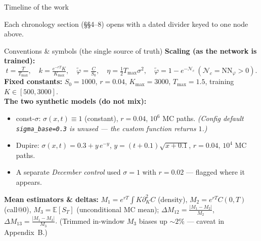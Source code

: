 \documentclass[aspectratio=169,11pt]{beamer}
\newcommand{\gold}[1]{{\color{ntugold}#1}}
\begin{document}
\begin{frame}{Timeline of the work}
  \vspace{0.2cm}
  \begin{center}
  \end{center}
  \vspace{0.4em}
  {\footnotesize Each chronology section (\S\S4--8) opens with a dated divider keyed to one node above.}
\end{frame}

\begin{frame}{Conventions \& symbols (the single source of truth)}
  \small
  \textbf{Scaling (as the network is trained):}
  \[
    t=\tfrac{T}{T_{\max}},\quad k=\tfrac{e^{-rT}K}{K_{\max}},\quad
    \tilde\varphi=\tfrac{C}{S_0},\quad \eta=\tfrac{1}{2}T_{\max}\sigma^2,\quad
    \boxed{\tilde\varphi=1-e^{-\mathcal{N}_c}}\ (\mathcal{N}_c=\mathrm{NN}_\varphi>0).
  \]
  \textbf{Fixed constants:} $S_0=1000$, $r=0.04$, $K_{\max}=3000$, $T_{\max}=1.5$, training $K\in[500,3000]$.\\[0.3em]
  \textbf{The two synthetic models (do not mix):}
  \begin{itemize}\footnotesize
    \item \gold{const-$\sigma$}: $\sigma(x,t)\equiv1$ (constant), $r=0.04$, $10^6$ MC paths.
          \emph{(Config default \texttt{sigma\_base=0.3} is unused --- the custom function returns $1$.)}
    \item \gold{Dupire}: $\sigma(x,t)=0.3+y\,e^{-y}$, $y=(t{+}0.1)\sqrt{x{+}0.1}$, $r=0.04$, $10^4$ MC paths.
    \item A separate \emph{December control} used $\sigma{=}1$ with $r{=}0.02$ --- flagged where it appears.
  \end{itemize}
  \textbf{Mean estimators \& deltas:} $M_1=e^{rT}\!\int K\partial_K^2C$ (density), $M_2=e^{rT}C(0,T)$ (call@0),
  $M_3=\mathbb{E}[S_T]$ (\gold{unconditional} MC mean);
  $\Delta M_{12}=\tfrac{|M_1-M_2|}{M_2}$, $\Delta M_{13}=\tfrac{|M_1-M_3|}{M_3}$.
  {\footnotesize (Trimmed in-window $M_3$ biases up $\sim2\%$ --- caveat in Appendix~B.)}
\end{frame}
\end{document}
